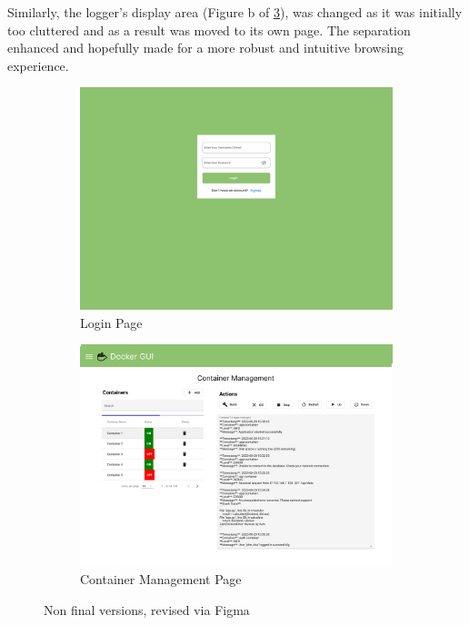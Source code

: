 \documentclass[multi, tikz, a4paper, oneside]{article}
\begin{document}
Similarly, the logger's display area (Figure b of
\ref{fig:login-registration-old}), was changed as it was initially too cluttered
and as a result was moved to its own page. The separation enhanced and hopefully
made for a more robust and intuitive browsing experience.

\begin{figure}[h]
  \centering
  \begin{subfigure}{.5\textwidth}
    \centering
    \includegraphics[width=.95\linewidth]{diagrams/1.login-old.pdf}
    \caption{Login Page}
    \label{fig:sub1}
  \end{subfigure}%
  \begin{subfigure}{.5\textwidth}
    \centering
    \includegraphics[width=.95\linewidth]{diagrams/3.container-old.pdf}
    \caption{Container Management Page}
    \label{fig:sub2}
  \end{subfigure}
  \caption{Non final versions, revised via Figma}
  \label{fig:login-registration-old}
\end{figure}
\end{document}
